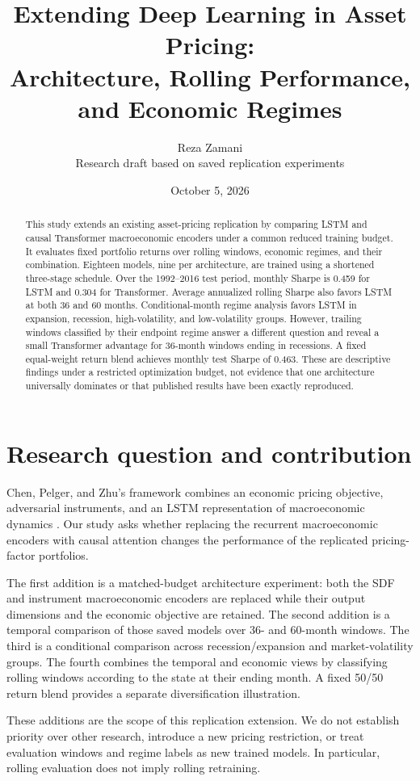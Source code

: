 \documentclass[11pt]{article}
\title{Extending Deep Learning in Asset Pricing:\\Architecture, Rolling Performance, and Economic Regimes}
\author{Reza Zamani\\Research draft based on saved replication experiments}
\date{October 5, 2026}
\begin{document}
\maketitle
\begin{abstract}
This study extends an existing asset-pricing replication by comparing LSTM and causal Transformer macroeconomic encoders under a common reduced training budget. It evaluates fixed portfolio returns over rolling windows, economic regimes, and their combination. Eighteen models, nine per architecture, are trained using a shortened three-stage schedule. Over the 1992--2016 test period, monthly Sharpe is 0.459 for LSTM and 0.304 for Transformer. Average annualized rolling Sharpe also favors LSTM at both 36 and 60 months. Conditional-month regime analysis favors LSTM in expansion, recession, high-volatility, and low-volatility groups. However, trailing windows classified by their endpoint regime answer a different question and reveal a small Transformer advantage for 36-month windows ending in recessions. A fixed equal-weight return blend achieves monthly test Sharpe of 0.463. These are descriptive findings under a restricted optimization budget, not evidence that one architecture universally dominates or that published results have been exactly reproduced.
\end{abstract}
\section{Research question and contribution}
Chen, Pelger, and Zhu's framework combines an economic pricing objective, adversarial instruments, and an LSTM representation of macroeconomic dynamics \cite{cpz}. Our study asks whether replacing the recurrent macroeconomic encoders with causal attention changes the performance of the replicated pricing-factor portfolios.

The first addition is a matched-budget architecture experiment: both the SDF and instrument macroeconomic encoders are replaced while their output dimensions and the economic objective are retained. The second addition is a temporal comparison of those saved models over 36- and 60-month windows. The third is a conditional comparison across recession/expansion and market-volatility groups. The fourth combines the temporal and economic views by classifying rolling windows according to the state at their ending month. A fixed 50/50 return blend provides a separate diversification illustration.

These additions are the scope of this replication extension. We do not establish priority over other research, introduce a new pricing restriction, or treat evaluation windows and regime labels as new trained models. In particular, rolling evaluation does not imply rolling retraining.
\end{document}

